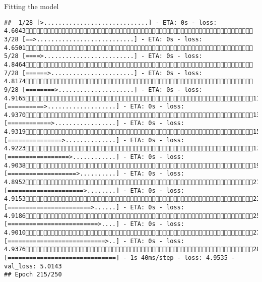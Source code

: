 \documentclass[
  ignorenonframetext,
]{beamer}
\begin{document}
\begin{frame}[fragile]{Fitting the model}
\begin{verbatim}
##  1/28 [>.............................] - ETA: 0s - loss: 4.6043 3/28 [==>...........................] - ETA: 0s - loss: 4.6501 5/28 [====>.........................] - ETA: 0s - loss: 4.8464 7/28 [======>.......................] - ETA: 0s - loss: 4.8174 9/28 [========>.....................] - ETA: 0s - loss: 4.916511/28 [==========>...................] - ETA: 0s - loss: 4.937013/28 [============>.................] - ETA: 0s - loss: 4.931915/28 [===============>..............] - ETA: 0s - loss: 4.922317/28 [=================>............] - ETA: 0s - loss: 4.903819/28 [===================>..........] - ETA: 0s - loss: 4.895221/28 [=====================>........] - ETA: 0s - loss: 4.915323/28 [=======================>......] - ETA: 0s - loss: 4.918625/28 [=========================>....] - ETA: 0s - loss: 4.901027/28 [===========================>..] - ETA: 0s - loss: 4.937628/28 [==============================] - 1s 40ms/step - loss: 4.9535 - val_loss: 5.0143
## Epoch 215/250

\end{verbatim}
\end{frame}
\end{document}
